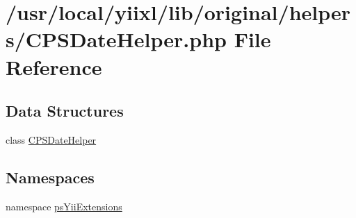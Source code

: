 \hypertarget{CPSDateHelper_8php}{
\section{/usr/local/yiixl/lib/original/helpers/CPSDateHelper.php File Reference}
\label{CPSDateHelper_8php}
}
\subsection*{Data Structures}
\begin{DoxyCompactItemize}
\item 
class \hyperlink{classCPSDateHelper}{CPSDateHelper}
\end{DoxyCompactItemize}
\subsection*{Namespaces}
\begin{DoxyCompactItemize}
\item 
namespace \hyperlink{namespacepsYiiExtensions}{psYiiExtensions}
\end{DoxyCompactItemize}
